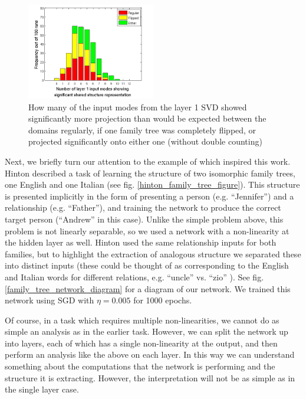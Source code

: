 \documentclass[10pt,letterpaper]{article}
\begin{document}
\begin{figure}
\centering
\includegraphics[width=0.5\textwidth]{figures/ft_input_mode_significance_hist.png}
\caption{How many of the input modes from the layer 1 SVD showed significantly more projection than would be expected between the domains regularly, if one family tree was completely flipped, or projected significantly onto either one (without double counting)}
\label{ft_input_mode_sig_hist}
\end{figure}
Next, we briefly turn our attention to the example of \citet{Hinton1986} which inspired this work. Hinton described a task of learning the structure of two isomorphic family trees, one English and one Italian (see fig. \ref{hinton_family_tree_figure}). This structure is presented implicitly in the form of presenting a person (e.g. ``Jennifer'') and a relationship (e.g. ``Father''), and training the network to produce the correct target person (``Andrew'' in this case). Unlike the simple problem above, this problem is not linearly separable, so we used a network with a non-linearity at the hidden layer as well. Hinton used the same relationship inputs for both families, but to highlight the extraction of analogous structure we separated these into distinct inputs (these could be thought of as corresponding to the English and Italian words for different relations, e.g. ``uncle'' vs. ``zio'' ). See fig. \ref{family_tree_network_diagram} for a diagram of our network. We trained this network using SGD with \(\eta = 0.005\) for 1000 epochs. \par 
Of course, in a task which requires multiple non-linearities, we cannot do as simple an analysis as in the earlier task. However, we can split the network up into layers, each of which has a single non-linearity at the output, and then perform an analysis like the above on each layer. In this way we can understand something about the computations that the network is performing and the structure it is extracting. However, the interpretation will not be as simple as in the single layer case. \par
\end{document}
